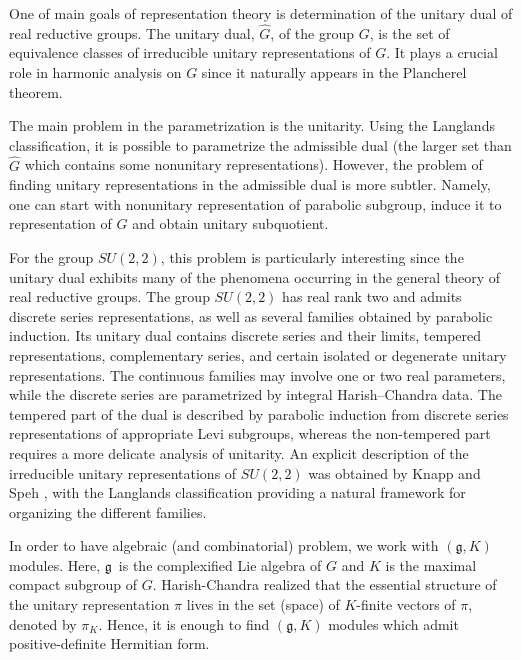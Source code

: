 \documentclass[twoside,a4paper,12pt]{article}
\newcommand{\g}{\ensuremath{\mathfrak g}}
\theoremstyle{definition}
\begin{document}
One of main goals of representation theory is determination of the unitary dual
of real reductive groups. The unitary dual, $\hat{G}$, of the group $G$, is the
set of equivalence classes of irreducible unitary representations of $G$. It
plays a crucial role in harmonic analysis on $G$ since it naturally appears in
the Plancherel theorem.

The main problem in the parametrization is the unitarity. Using the Langlands
classification, it is possible to parametrize the admissible dual
(the larger set than $\hat{G}$ which contains some nonunitary representations).
However, the problem of finding unitary representations in the admissible
dual is more subtler. Namely, one can start with nonunitary representation of
parabolic subgroup, induce it to representation of $G$ and obtain unitary
subquotient.

For the group $SU(2,2)$, this problem is particularly interesting since
the unitary dual exhibits many of the phenomena occurring in the general
theory of real reductive groups.
The group $SU(2,2)$ has real rank two and admits discrete series
representations, as well as several families obtained by parabolic
induction.
Its unitary dual contains discrete series and their limits, tempered
representations, complementary series, and certain isolated or
degenerate unitary representations.
The continuous families may involve one or two real parameters, while
the discrete series are parametrized by integral Harish--Chandra data.
The tempered part of the dual is described by parabolic induction from
discrete series representations of appropriate Levi subgroups, whereas
the non-tempered part requires a more delicate analysis of unitarity.
An explicit description of the irreducible unitary representations of
$SU(2,2)$ was obtained by Knapp and Speh \cite{KnappSpeh1982}, with the
Langlands classification providing a natural framework for organizing
the different families.

In order to have algebraic (and combinatorial) problem, we work with $(\g,K)$
modules. Here, \g\ is the complexified Lie algebra of $G$ and $K$ is the maximal
compact subgroup of $G$. Harish-Chandra realized that the essential structure
of the unitary representation $\pi$ lives in the set (space) of $K$-finite
vectors of $\pi$, denoted by $\pi_K$. Hence, it is enough to find $(\g,K)$
modules which admit positive-definite Hermitian form.
\end{document}
